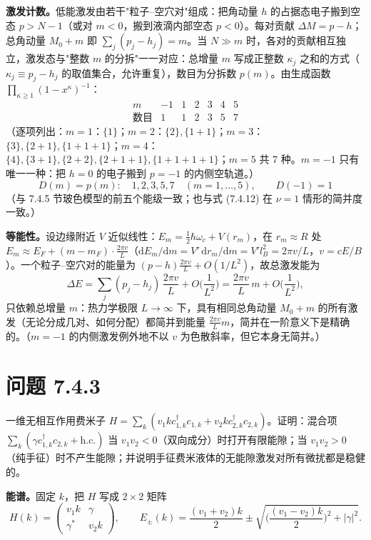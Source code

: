 \textbf{激发计数。}低能激发由若干"粒子--空穴对"组成：把角动量 $h$ 的占据态电子搬到空态 $p>N-1$（或对 $m<0$，搬到液滴内部空态 $p<0$）。每对贡献 $\Delta M=p-h$；总角动量 $M_0+m$ 即 $\sum_j(p_j-h_j)=m$。当 $N\gg m$ 时，各对的贡献相互独立，激发态与"整数 $m$ 的分拆"一一对应：总增量 $m$ 写成正整数 $\kappa_j$ 之和的方式（$\kappa_j\equiv p_j-h_j$ 的取值集合，允许重复），数目为分拆数 $p(m)$。由生成函数 $\prod_{\kappa\geqslant1}(1-x^{\kappa})^{-1}$：
\begin{equation*}
\begin{array}{c|cccccc}
m & -1 & 1 & 2 & 3 & 4 & 5\\ \hline
\text{数目} & 1 & 1 & 2 & 3 & 5 & 7
\end{array}
\end{equation*}
（逐项列出：$m=1$：$\{1\}$；$m=2$：$\{2\},\{1+1\}$；$m=3$：$\{3\},\{2+1\},\{1+1+1\}$；$m=4$：$\{4\},\{3+1\},\{2+2\},\{2+1+1\},\{1+1+1+1\}$；$m=5$ 共 7 种。$m=-1$ 只有唯一一种：把 $h=0$ 的电子搬到 $p=-1$ 的内侧空轨道。）
\begin{equation*}
\boxed{\;D(m)=p(m):\quad 1,2,3,5,7\quad(m=1,\dots,5),\qquad D(-1)=1\;}
\end{equation*}
（与 7.4.5 节玻色模型的前五个能级一致；也与式 (7.4.12) 在 $\nu=1$ 情形的简并度一致。）

\textbf{等能性。}设边缘附近 $V$ 近似线性：$E_m=\frac12\hbar\omega_c+V(r_m)$，在 $r_m\approx R$ 处 $E_m\approx E_F+(m-m_F)\cdot\frac{2\pi v}{L}$（$\mathrm{d}E_m/\mathrm{d}m=V'\,\mathrm{d}r_m/\mathrm{d}m=V'l_B^2=2\pi v/L$，$v=cE/B$）。一个粒子--空穴对的能量为 $(p-h)\frac{2\pi v}{L}+O(1/L^2)$，故总激发能为
\begin{equation*}
\Delta E=\sum_j(p_j-h_j)\,\frac{2\pi v}{L}+O\Big(\frac1{L^2}\Big)
=\frac{2\pi v}{L}\,m+O\Big(\frac{1}{L^{2}}\Big),
\end{equation*}
只依赖总增量 $m$：热力学极限 $L\to\infty$ 下，具有相同总角动量 $M_0+m$ 的所有激发（无论分成几对、如何分配）都简并到能量 $\frac{2\pi v}{L}m$，简并在一阶意义下是精确的。（$m=-1$ 的内侧激发例外地不以 $v$ 为色散斜率，但它本身无简并。）

\section*{问题 7.4.3}
\begin{problem}
一维无相互作用费米子 $H=\sum_k(v_1kc^{\dagger}_{1,k}c_{1,k}+v_2kc^{\dagger}_{2,k}c_{2,k})$。证明：混合项 $\sum_k(\gamma c^{\dagger}_{1,k}c_{2,k}+\text{h.c.})$ 当 $v_1v_2<0$（双向成分）时打开有限能隙；当 $v_1v_2>0$（纯手征）时不产生能隙；并说明手征费米液体的无能隙激发对所有微扰都是稳健的。
\end{problem}
\solution
\textbf{能谱。}固定 $k$，把 $H$ 写成 $2\times2$ 矩阵
\begin{equation*}
H(k)=\begin{pmatrix} v_1k & \gamma\\ \gamma^{*} & v_2k\end{pmatrix},
\qquad
E_{\pm}(k)=\frac{(v_1+v_2)k}{2}\pm\sqrt{\Big(\frac{(v_1-v_2)k}{2}\Big)^{2}+|\gamma|^2} .
\end{equation*}

